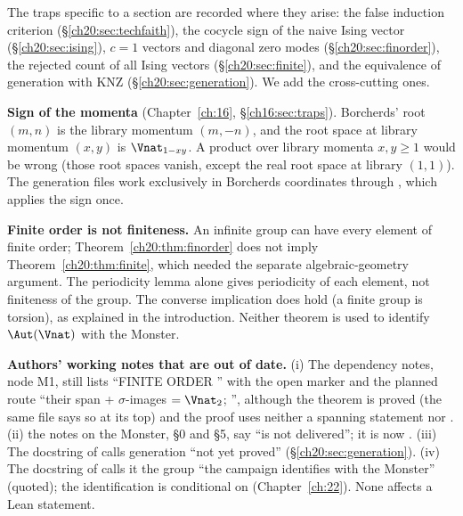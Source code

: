 The traps specific to a section are recorded where they arise: the false induction criterion
(\S\ref{ch20:sec:techfaith}), the cocycle sign of the naive Ising vector (\S\ref{ch20:sec:ising}), $c=1$ vectors and diagonal
zero modes (\S\ref{ch20:sec:finorder}), the rejected count of all Ising vectors (\S\ref{ch20:sec:finite}), and the equivalence of
generation with KNZ (\S\ref{ch20:sec:generation}).  We add the cross-cutting ones.

\begin{warning}
\textbf{Sign of the momenta} (Chapter~\ref{ch:16}, \S\ref{ch16:sec:traps}).  Borcherds' root $(m,n)$ is the library momentum
$(m,-n)$, and the root space at library momentum $(x,y)$ is $\Vnat_{1-xy}$.  A product over library momenta $x,y\ge1$ would be
wrong (those root spaces vanish, except the real root space at library $(1,1)$).  The generation files work exclusively in Borcherds coordinates through
, which applies the sign once.
\end{warning}

\begin{warning}
\textbf{Finite order is not finiteness.}  An infinite group can have every element of finite
order; Theorem~\ref{ch20:thm:finorder} does not imply Theorem~\ref{ch20:thm:finite}, which needed the separate algebraic-geometry
argument.  The periodicity lemma alone gives periodicity of each element, not finiteness of the group.  The converse
implication does hold (a finite group is torsion), as explained in the introduction.  Neither theorem is used to identify
$\Aut(\Vnat)$ with the Monster.
\end{warning}

\begin{warning}
\textbf{Authors' working notes that are out of date.}  (i) The dependency notes,
node M1, still lists ``FINITE ORDER '' with the open marker and the planned route ``their span +
$\sigma$-images $=\Vnat_2$; '', although the theorem is proved (the same file says so at its
top) and the proof uses neither a spanning statement nor .  (ii)
the notes on the Monster, \S0 and \S5, say  ``is not delivered''; it is now
.  (iii) The docstring of  calls generation ``not yet proved''
(\S\ref{ch20:sec:generation}).  (iv) The docstring of  calls it the group ``the campaign identifies with the
Monster'' (quoted); the identification is conditional on  (Chapter~\ref{ch:22}).  None affects a Lean statement.
\end{warning}

